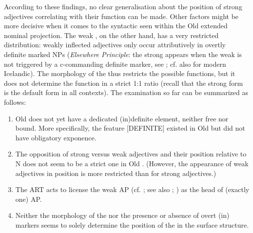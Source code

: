 \documentclass[output=paper,colorlinks,citecolor=brown]{langscibook}
\begin{document}
\begin{sloppypar}
According to these findings, no clear generalisation about the position
of strong adjectives correlating with their function can be made.
Other factors might be more decisive when it comes to the syntactic
 seen within the Old  extended nominal projection. The
weak , on the other hand, has a very restricted distribution:
weakly inflected adjectives only occur attributively in overtly definite
marked NPs (\emph{Elsewhere Principle}: the strong  appears
when the weak  is not triggered by a c-commanding definite marker, see \cite[13]{Pfaff2019}; cf. also \citealp{Pfaff2015} for modern Icelandic). The morphology of the
 thus restricts the possible functions, but it does not
determine the function in a strict 1:1 ratio (recall that the strong
form is the default form in all contexts). The examination so
far can be summarized as follows:
\end{sloppypar}

\begin{enumerate}
  \item  Old  does not yet have a dedicated (in)definite element,
neither free nor bound. More specifically, the feature {[}DEFINITE{]}
existed in Old  but did not have obligatory exponence.

\item The opposition of strong versus weak adjectives and their position
relative to N does not seem to be a strict one in Old .
(However, the appearance of weak adjectives in  position is
more restricted than for strong adjectives.)

\item The  ART acts to license the weak AP (cf. \citealp{Pfaff2019}; see also \citealp[8]{PerridonSleeman2011}; \citealp[7f]{StrohWollin2009}) as the head of
(exactly one) AP.

\item Neither the morphology of the  nor the presence or absence
of overt (in) markers seems to solely determine the position
of the  in the surface structure.
\end{enumerate}
\end{document}

